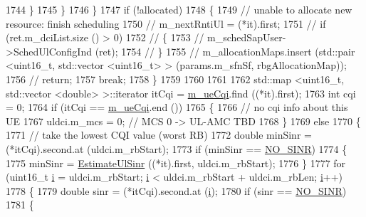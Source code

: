 \begin{DoxyCode}
1744                 \}
1745             \}
1746         \}
1747       \textcolor{keywordflow}{if} (!allocated)
1748         \{
1749           \textcolor{comment}{// unable to allocate new resource: finish scheduling}
1750 \textcolor{comment}{//          m\_nextRntiUl = (*it).first;}
1751 \textcolor{comment}{//          if (ret.m\_dciList.size () > 0)}
1752 \textcolor{comment}{//            \{}
1753 \textcolor{comment}{//              m\_schedSapUser->SchedUlConfigInd (ret);}
1754 \textcolor{comment}{//            \}}
1755 \textcolor{comment}{//          m\_allocationMaps.insert (std::pair <uint16\_t, std::vector <uint16\_t> > (params.m\_sfnSf,
       rbgAllocationMap));}
1756 \textcolor{comment}{//          return;}
1757           \textcolor{keywordflow}{break};
1758         \}
1759 
1760 
1761 
1762       std::map <uint16\_t, std::vector <double> >::iterator itCqi = \hyperlink{classns3_1_1TdTbfqFfMacScheduler_a5cf85878fa75fd31bdc63527492e9270}{m\_ueCqi}.find ((*it).first);
1763       \textcolor{keywordtype}{int} cqi = 0;
1764       \textcolor{keywordflow}{if} (itCqi == \hyperlink{classns3_1_1TdTbfqFfMacScheduler_a5cf85878fa75fd31bdc63527492e9270}{m\_ueCqi}.end ())
1765         \{
1766           \textcolor{comment}{// no cqi info about this UE}
1767           uldci.m\_mcs = 0; \textcolor{comment}{// MCS 0 -> UL-AMC TBD}
1768         \}
1769       \textcolor{keywordflow}{else}
1770         \{
1771           \textcolor{comment}{// take the lowest CQI value (worst RB)}
1772           \textcolor{keywordtype}{double} minSinr = (*itCqi).second.at (uldci.m\_rbStart);
1773           \textcolor{keywordflow}{if} (minSinr == \hyperlink{cqa-ff-mac-scheduler_8h_a520d71777be043568160c783a9c65fd5}{NO\_SINR})
1774             \{
1775               minSinr = \hyperlink{classns3_1_1TdTbfqFfMacScheduler_a9d1ab86d5693cc316f2c30fff137311e}{EstimateUlSinr} ((*it).first, uldci.m\_rbStart);
1776             \}
1777           \textcolor{keywordflow}{for} (uint16\_t \hyperlink{bernuolliDistribution_8m_a6f6ccfcf58b31cb6412107d9d5281426}{i} = uldci.m\_rbStart; \hyperlink{bernuolliDistribution_8m_a6f6ccfcf58b31cb6412107d9d5281426}{i} < uldci.m\_rbStart + uldci.m\_rbLen; 
      \hyperlink{bernuolliDistribution_8m_a6f6ccfcf58b31cb6412107d9d5281426}{i}++)
1778             \{
1779               \textcolor{keywordtype}{double} sinr = (*itCqi).second.at (\hyperlink{bernuolliDistribution_8m_a6f6ccfcf58b31cb6412107d9d5281426}{i});
1780               \textcolor{keywordflow}{if} (sinr == \hyperlink{cqa-ff-mac-scheduler_8h_a520d71777be043568160c783a9c65fd5}{NO\_SINR})
1781                 \{

\end{DoxyCode}

